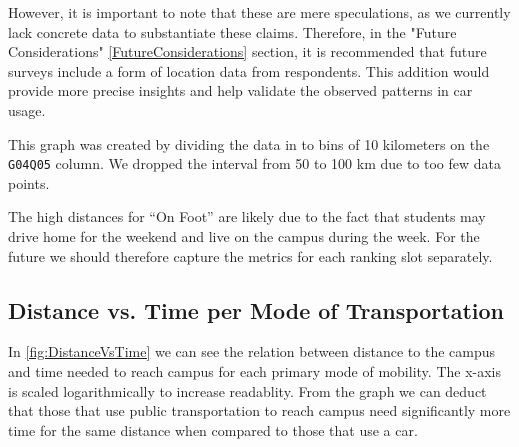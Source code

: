 However, it is important to note that these are mere speculations, as we currently lack concrete data to substantiate these claims. Therefore, in the "Future Considerations" \ref{FutureConsiderations} section, it is recommended that future surveys include a form of location data from respondents. This addition would provide more precise insights and help validate the observed patterns in car usage.

This graph was created by dividing the data in to bins of 10 kilometers on the \texttt{G04Q05} column. We dropped the interval from 50 to 100 km due to too few data points.

The high distances for ``On Foot'' are likely due to the fact that students may drive home for the weekend and live on the campus during the week. For the future we should therefore capture the metrics for each ranking slot separately.

\pagebreak

\subsection{Distance vs. Time per Mode of Transportation}
\begin{multicols}{2}
    
    \columnbreak
    In \ref{fig:DistanceVsTime} we can see the relation between distance to the campus and time needed to reach campus for each primary mode of mobility. The x-axis is scaled logarithmically to increase readablity. From the graph we can deduct that those that use public transportation to reach campus need significantly more time for the same distance when compared to those that use a car.
\end{multicols}

